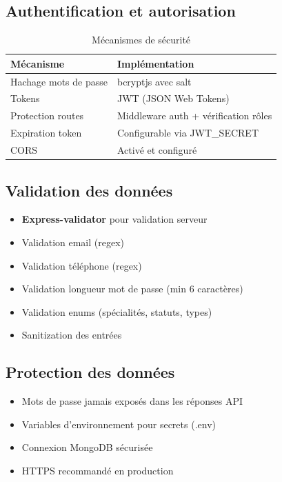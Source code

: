 \documentclass[12pt,a4paper]{article}
\begin{document}
\subsection{Authentification et autorisation}

\begin{table}[h]
\centering
\begin{tabular}{|l|p{8cm}|}
\hline
\textbf{Mécanisme} & \textbf{Implémentation} \\
\hline
Hachage mots de passe & bcryptjs avec salt \\
Tokens & JWT (JSON Web Tokens) \\
Protection routes & Middleware auth + vérification rôles \\
Expiration token & Configurable via JWT\_SECRET \\
CORS & Activé et configuré \\
\hline
\end{tabular}
\caption{Mécanismes de sécurité}
\end{table}

\subsection{Validation des données}

\begin{itemize}
    \item[\checkmark] \textbf{Express-validator} pour validation serveur
    \item[\checkmark] Validation email (regex)
    \item[\checkmark] Validation téléphone (regex)
    \item[\checkmark] Validation longueur mot de passe (min 6 caractères)
    \item[\checkmark] Validation enums (spécialités, statuts, types)
    \item[\checkmark] Sanitization des entrées
\end{itemize}

\subsection{Protection des données}

\begin{itemize}
    \item[\checkmark] Mots de passe jamais exposés dans les réponses API
    \item[\checkmark] Variables d'environnement pour secrets (.env)
    \item[\checkmark] Connexion MongoDB sécurisée
    \item[\checkmark] HTTPS recommandé en production
\end{itemize}
\end{document}
